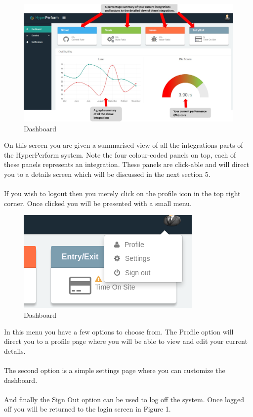 \documentclass[11pt,a4paper]{article}
\begin{document}
\begin{figure}[H]
	\begin{center}
		\includegraphics[scale=0.27]{../Images/dashboard.jpg}
		\caption{Dashboard}
	\end{center}
\end{figure}
\noindent
On this screen you are given a summarised view of all the integrations parts of the HyperPerform system. Note the four colour-coded panels on top, each of these panels represents an integration. These panels are click-able and will direct you to a details screen which will be discussed in the next section 5. \\ \\
If you wish to logout then you merely click on the profile icon in the top right corner. Once clicked you will be presented with a small menu. 

\begin{figure}[H]
	\begin{center}
		\includegraphics[scale=0.7]{../Images/logout}
		\caption{Dashboard}
	\end{center}
\end{figure}
\noindent
In this menu you have a few options to choose from. The Profile option will direct you to a profile page where you will be able to view and edit your current details. \\ \\
The second option is a simple settings page where you can customize the dashboard.\\ \\
And finally the Sign Out option can be used to log off the system. Once logged off you will be returned to the login screen in Figure 1.
\end{document}
